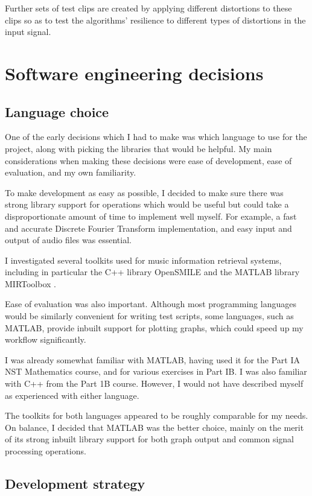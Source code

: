 \documentclass[12pt,a4paper,twoside,openright]{report}
\begin{document}
Further sets of test clips are created by applying different distortions to these clips so as to test the algorithms' resilience to different types of distortions in the input signal.



\section{Software engineering decisions}

\subsection{Language choice}

One of the early decisions which I had to make was which language to use for the project, along with picking the libraries that would be helpful. My main considerations when making these decisions were ease of development, ease of evaluation, and my own familiarity.

To make development as easy as possible, I decided to make sure there was strong library support for operations which would be useful but could take a disproportionate amount of time to implement well myself. For example, a fast and accurate Discrete Fourier Transform implementation, and easy input and output of audio files was essential.

I investigated several toolkits used for music information retrieval systems, including in particular the C++ library OpenSMILE \cite{Eyben10} and the MATLAB library MIRToolbox \cite{Lartillot07}.

Ease of evaluation was also important. Although most programming languages would be similarly convenient for writing test scripts, some languages, such as MATLAB, provide inbuilt support for plotting graphs, which could speed up my workflow significantly.

I was already somewhat familiar with MATLAB, having used it for the Part IA NST Mathematics course, and for various exercises in Part IB. I was also familiar with C++ from the Part 1B course. However, I would not have described myself as experienced with either language.

The toolkits for both languages appeared to be roughly comparable for my needs. On balance, I decided that MATLAB was the better choice, mainly on the merit of its strong inbuilt library support for both graph output and common signal processing operations.


\subsection{Development strategy}
\label{section:devstrat}
\end{document}
